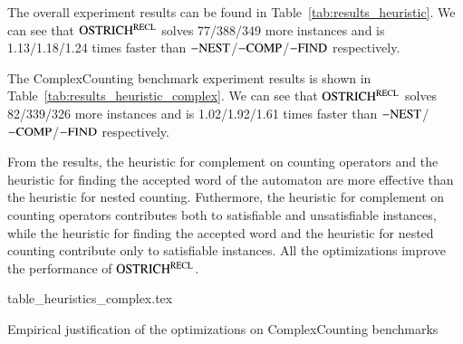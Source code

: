 The overall experiment results can be found in Table~\ref{tab:results_heuristic}. We can see that $\rm OSTRICH^{RECL}$ solves 77/388/349 more instances and is 1.13/1.18/1.24 times faster than ${\rm -NEST}$/${\rm -COMP}$/${\rm -FIND}$ respectively. 

The ComplexCounting benchmark experiment results is shown in Table~\ref{tab:results_heuristic_complex}. We can see that $\rm OSTRICH^{RECL}$ solves 82/339/326 more instances and is 1.02/1.92/1.61 times faster than ${\rm -NEST}$/${\rm -COMP}$/${\rm -FIND}$ respectively.

From the results, the heuristic for complement on counting operators and the heuristic for finding the accepted word of the automaton are more effective than the heuristic for nested counting. Futhermore, the heuristic for complement on counting operators contributes both to satisfiable and unsatisfiable instances, while the heuristic for finding the accepted word and the heuristic for nested counting contribute only to satisfiable instances.
All the optimizations improve the performance of $\rm OSTRICH^{RECL}$.

\begin{table}
  {table_heuristics_complex.tex}
  \caption{Empirical justification of the optimizations on ComplexCounting benchmarks}\label{tab:results_heuristic_complex}
\end{table}


